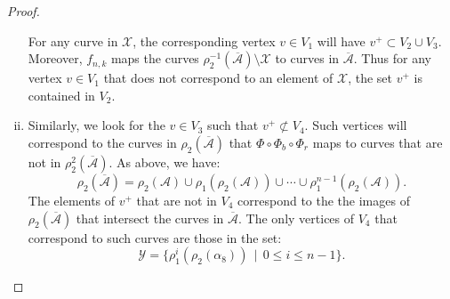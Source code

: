 \begin{proof}
\begin{enumerate}[(i)]
For any curve in $\mathcal{X}$, the corresponding vertex $v\in V_1$ will have
  $v^+ \subset V_2 \cup V_3.$  Moreover, $f_{n,k}$ maps the curves $\rho_2^{-1}(\overline{\mathcal{A}})\setminus \mathcal{X}$ to curves in $\overline{\mathcal{A}}$.  Thus for any vertex $v\in V_1$ that does not correspond to an element of $\mathcal{X}$, the set $v^+$ is contained in $V_2$.
\item  Similarly, we look for the $v \in V_3$ such that $v^+ \not\subset V_4$.  Such vertices will correspond to the curves in $\rho_2(\overline{\mathcal{A}})$ that $\Phi\circ\Phi_b\circ\Phi_r$ maps to curves that are not in $\rho_2^2(\overline{\mathcal{A}})$.  As above, we have: $$\rho_2(\overline{\mathcal{A}})=\rho_2(\mathcal{A})\cup\rho_1(\rho_2(\mathcal{A}))\cup\cdots\cup\rho_1^{n-1}(\rho_2(\mathcal{A})).$$
The elements of $v^+$ that are not in $V_4$ correspond to the the images of $\rho_2(\overline{\mathcal{A}})$ that intersect the curves in $\overline{\mathcal{A}}$.
The only vertices of $V_4$ that correspond to such curves are those in the set:
 $$\mathcal{Y}=\{\rho_1^i(\rho_2(\alpha_8))\,\mid\,0\leq i\leq n-1\}.$$ %
 


\end{enumerate}
\end{proof}
